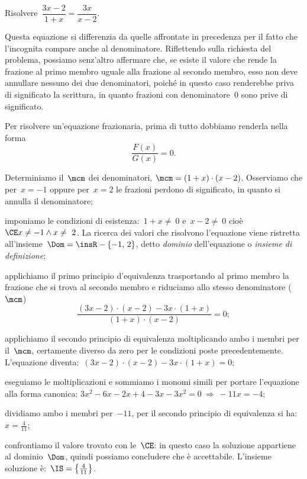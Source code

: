 \begin{exrig}
 \begin{esempio}
Risolvere~$\dfrac{3x-2}{1+x}=\dfrac{3x}{x-2}$.
 \end{esempio}
Questa equazione si differenzia da quelle affrontate in precedenza per il fatto che l'incognita compare anche al denominatore.
Riflettendo sulla richiesta del problema, possiamo senz’altro affermare che, se esiste il valore che rende
la frazione al primo membro uguale alla frazione al secondo membro, esso non deve annullare nessuno dei due denominatori,
poiché in questo caso renderebbe priva di significato la scrittura, in quanto frazioni con denominatore~$0$ sono prive di significato.

Per risolvere un'equazione frazionaria, prima di tutto dobbiamo renderla nella forma
\begin{equation*}
\frac{F(x)}{G(x)}=0.
\end{equation*}

\begin{enumeratea}
 \item Determiniamo il~$\mcm$ dei denominatori, $\mcm=(1+x)\cdot (x-2)$.
    Osserviamo che per~$x = -1$ oppure per~$x = 2$ le frazioni perdono di significato, in quanto si annulla il denominatore;
 \item imponiamo le condizioni di esistenza:~$1+x\neq~0$ e~$x-2\neq~0$ cioè~$\CE x\neq -1\wedge x\neq~2$. La ricerca dei valori
    che risolvono l'equazione viene ristretta all'insieme~$\Dom=\insR-\{-1\text{,~}2\}$, detto \emph{dominio} dell’equazione o
    \emph{insieme di definizione};
 \item applichiamo il primo principio d’equivalenza trasportando al primo membro la frazione che si trova al secondo membro
    e riduciamo allo stesso denominatore ($\mcm$)
    \begin{equation*}
      \frac{(3x-2)\cdot (x-2)-3x\cdot (1+x)}{(1+x)\cdot (x-2)}=0;
    \end{equation*}
 \item applichiamo il secondo principio di equivalenza moltiplicando ambo i membri per il~$\mcm$,
    certamente diverso da zero per le condizioni poste precedentemente. L’equazione diventa:~$(3x-2)\cdot (x-2)-3x\cdot (1+x)=0$;
 \item eseguiamo le moltiplicazioni e sommiamo i monomi simili per portare l’equazione alla forma canonica:
    $3x^{2}-6x-2x+4-3x-3x^{2}=0\: \Rightarrow\: -11x=-4$;
 \item dividiamo ambo i membri per~$-11$, per il secondo principio di equivalenza si ha:~$x=\frac{4}{11}$;
 \item confrontiamo il valore trovato con le~$\CE$: in questo caso la soluzione appartiene al dominio~$\Dom$, quindi possiamo concludere
    che è accettabile. L’insieme soluzione è:~$\IS=\left\{\frac{4}{11}\right\}$.
\end{enumeratea}


\end{exrig}
